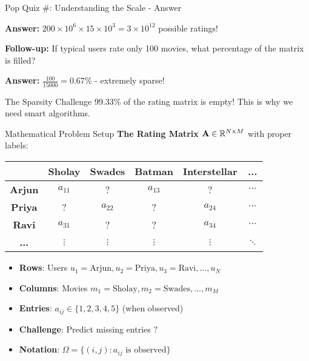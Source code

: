\documentclass{beamer}
\begin{document}
\begin{frame}{Pop Quiz \#\thepopquiz: Understanding the Scale - Answer}
\begin{popquizbox}{\thepopquiz}
\textbf{Answer:} $200 \times 10^6 \times 15 \times 10^3 = 3 \times 10^{12}$ possible ratings!

\textbf{Follow-up:} If typical users rate only 100 movies, what percentage of the matrix is filled?

\textbf{Answer:} $\frac{100}{15000} = 0.67\%$ - extremely sparse!
\end{popquizbox}

\pause
\begin{alertbox}{The Sparsity Challenge}
99.33\% of the rating matrix is empty! This is why we need smart algorithms.
\end{alertbox}
\end{frame}

\begin{frame}{Mathematical Problem Setup}
\textbf{The Rating Matrix} $\mathbf{A} \in \mathbb{R}^{N \times M}$ with proper labels:

\pause
\begin{center}
\renewcommand{\arraystretch}{1.3}
\begin{tabular}{c|ccccc}
 & \textbf{Sholay} & \textbf{Swades} & \textbf{Batman} & \textbf{Interstellar} & \textbf{...} \\
\hline
\textbf{Arjun} & $a_{11}$ & ? & $a_{13}$ & ? & $\cdots$ \\
\textbf{Priya} & ? & $a_{22}$ & ? & $a_{24}$ & $\cdots$ \\
\textbf{Ravi} & $a_{31}$ & ? & ? & $a_{34}$ & $\cdots$ \\
\textbf{...} & $\vdots$ & $\vdots$ & $\vdots$ & $\vdots$ & $\ddots$
\end{tabular}
\end{center}

\pause
\begin{itemize}[<+->]
    \item \textbf{Rows}: Users $u_1 = \text{Arjun}, u_2 = \text{Priya}, u_3 = \text{Ravi}, \ldots, u_N$ 
    \item \textbf{Columns}: Movies $m_1 = \text{Sholay}, m_2 = \text{Swades}, \ldots, m_M$
    \item \textbf{Entries}: $a_{ij} \in \{1,2,3,4,5\}$ (when observed)
    \item \textbf{Challenge}: Predict missing entries $?$
    \item \textbf{Notation}: $\Omega = \{(i,j) : a_{ij} \text{ is observed}\}$
\end{itemize}
\end{frame}
\end{document}
